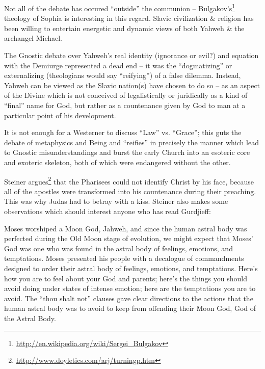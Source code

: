 Not all of the debate has occured ``outside'' the communion -- Bulgakov's\footnote{\url{http://en.wikipedia.org/wiki/Sergei\_Bulgakov}} theology of Sophia is interesting in this regard. Slavic civilization \& religion has been willing to entertain energetic and dynamic views of both Yahweh
\& the archangel Michael.


The Gnostic debate over Yahweh's real identity (ignorance or evil?) and equation with the Demiurge represented a dead end -- it was the ``dogmatizing'' or externalizing (theologians would say ``reifying'') of a false dilemma. Instead, Yahweh can be viewed as the Slavic nation(s) have chosen to do so -- as an aspect of the Divine which is not conceived of legalistically or juridically as a kind of ``final'' name for God, but rather as a countenance given by God to man at a particular point of his development.

It is not enough for a Westerner to discuss ``Law'' vs. ``Grace''; this guts the debate of metaphysics and Being and ``reifies'' in precisely the manner which lead to Gnostic misunderstandings and burst the early Church into an esoteric core and exoteric skeleton, both of which were endangered without the other.

Steiner argues\footnote{\url{http://www.doyletics.com/arj/turningp.htm}} that the Pharisees could not identify Christ by his face, because all of the apostles were transformed into his countenance during their preaching. This was why Judas had to betray with a kiss. Steiner also makes some observations which should interest anyone who has read Gurdjieff:

\begin{quotex}
Moses worshiped a Moon God, Jahweh, and since the human astral body was perfected during the Old Moon stage of evolution, we might expect that Moses' God was one who was found in the astral body of feelings, emotions, and temptations. Moses presented his people with a decalogue of commandments designed to order their astral body of feelings, emotions, and temptations. Here's how you are to feel about your God and parents; here's the things you should avoid doing under states of intense emotion; here are the temptations you are to avoid. The ``thou shalt not'' clauses gave clear directions to the actions that the human astral body was to avoid to keep from offending their Moon God, God of the Astral Body.
\end{quotex}


